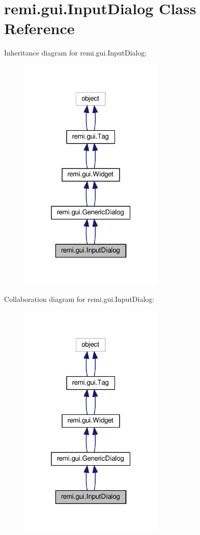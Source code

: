 \hypertarget{classremi_1_1gui_1_1InputDialog}{}\section{remi.\+gui.\+Input\+Dialog Class Reference}
\label{classremi_1_1gui_1_1InputDialog}


Inheritance diagram for remi.\+gui.\+Input\+Dialog\+:
\nopagebreak
\begin{figure}[H]
\begin{center}
\leavevmode
\includegraphics[width=196pt]{da/dbf/classremi_1_1gui_1_1InputDialog__inherit__graph}
\end{center}
\end{figure}


Collaboration diagram for remi.\+gui.\+Input\+Dialog\+:
\nopagebreak
\begin{figure}[H]
\begin{center}
\leavevmode
\includegraphics[width=196pt]{da/df1/classremi_1_1gui_1_1InputDialog__coll__graph}
\end{center}
\end{figure}

